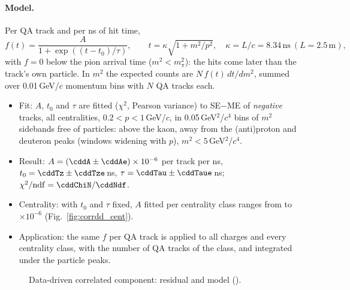 \paragraph{Model.} Per QA track and per ns of hit time,
\[ f(t)=\frac{A}{1+\exp\left((t-t_0)/\tau\right)}, \qquad t=\kappa\sqrt{1+m^2/p^2}, \quad \kappa=L/c=8.34\,\mathrm{ns}\ (L=2.5\,\mathrm{m}), \]
with $f=0$ below the pion arrival time ($m^2<m_\pi^2$): the hits come later than the track's own particle. In $m^2$ the expected
counts are $N\,f(t)\,dt/dm^2$, summed over 0.01\,GeV/$c$ momentum bins with $N$ QA tracks each.
\begin{itemize}
\item Fit: $A$, $t_0$ and $\tau$ are fitted ($\chi^2$, Pearson variance) to SE$-$ME of \emph{negative} tracks, all centralities,
  $0.2<p<1$\,GeV/$c$, in 0.05\,GeV$^2$/$c^4$ bins of $m^2$ sidebands free of particles: above the kaon, away from the (anti)proton and
  deuteron peaks (windows widening with $p$), $m^2<5$\,GeV$^2$/$c^4$.
\item Result: $A=(\cddA\pm\cddAe)\times10^{-6}$ per track per ns, $t_0=\cddTz\pm\cddTze$\,ns, $\tau=\cddTau\pm\cddTaue$\,ns;
  $\chi^2/\mathrm{ndf}=\cddChiN/\cddNdf$.
\item Centrality: with $t_0$ and $\tau$ fixed, $A$ fitted per centrality class ranges from \cddAmin{} to
  \cddAmax{}$\times10^{-6}$ (Fig.~\ref{fig:corrdd_cent}).
\item Application: the same $f$ per QA track is applied to all charges and every centrality class, with the number of QA tracks of the
  class, and integrated under the particle peaks.
\end{itemize}


\begin{figure}[H]
\centering
{}
\caption{Data-driven correlated component: residual and model ().}
\end{figure}

